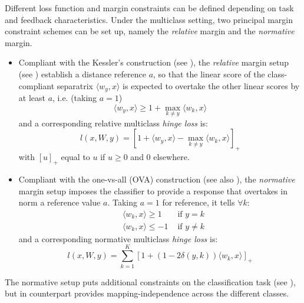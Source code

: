 \documentclass[preprint,12pt,authoryear]{elsarticle}
\begin{document}
Different loss function and margin constraints can be defined depending on task and feedback characteristics. 
Under the multiclass setting, two principal margin constraint schemes can be set up, namely the \emph{relative} margin and the \emph{normative} margin. 

\begin{itemize}
	\item Compliant with the Kessler's construction (see \cite{duda1973pattern}), the \emph{relative} margin setup (see \cite{crammer2003ultraconservative}) establish a distance reference $a$, so that the linear score of the class-compliant separatrix $\langle w_y, x\rangle$ is expected to overtake  the other linear scores by at least $a$, i.e. (taking $a=1$)
	\begin{equation}
	\label{eq:rel} \langle w_y, x \rangle \geq 1 + \max_{k \neq y} \langle w_k, x \rangle  	
	\end{equation}
	and a corresponding relative multiclass \emph{hinge loss} is:
	\begin{equation}
	\label{eq:rel-loss} l (x,W,y) =  \left[ 1 +  \langle w_y, x \rangle - \max_{k \neq y} \langle w_k, x\rangle\right]_+\end{equation}
	with $[u]_+$ equal to $u$ if $u\geq 0$ and 0 elsewhere.
	\item  Compliant with the one-vs-all (OVA) construction (see also \cite{allwein2000reducing}), the \emph{normative} margin setup imposes the classifier to provide a response that overtakes in norm a reference value $a$. Taking  $a = 1$ for reference, it tells $\forall k$: \begin{align}%
	&\langle w_k, x \rangle \geq 1 &\text{ if } y = k \label{eq:OVA-A}\\
	&\langle w_k, x \rangle \leq -1 &\text{ if }y \neq k \label{eq:OVA-B}
	\end{align}
	and a corresponding normative multiclass \emph{hinge loss} is:  
	\begin{equation}\label{eq:OVA-loss} l(x,W,y) = \sum_{k=1}^K \left[1 + (1 - 2 \delta(y,k)) \langle w_k,x \rangle\right]_+
	\end{equation}
\end{itemize}


The normative setup puts additional constraints on the classification task (see \cite{crammer2003ultraconservative}), but in counterpart provides mapping-independence across the different classes.

\end{document}
